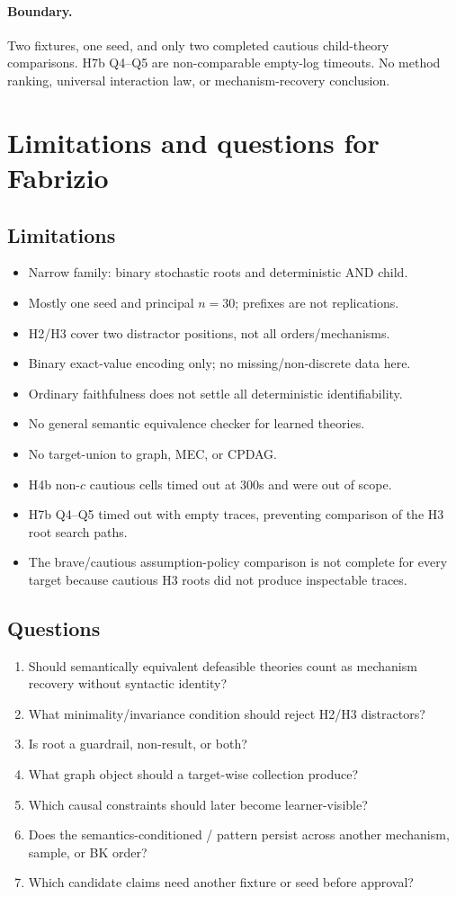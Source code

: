 \documentclass[11pt]{article}
\DeclareRobustCommand{\code}[1]{\texttt{\detokenize{#1}}}
\newcommand{\boundary}{\paragraph{Boundary.}}
\begin{document}
\boundary Two fixtures, one seed, and only two completed cautious child-theory
comparisons. H7b Q4--Q5 are non-comparable empty-log timeouts. No method
ranking, universal interaction law, or mechanism-recovery conclusion.

\section{Limitations and questions for Fabrizio}

\subsection{Limitations}
\begin{itemize}
  \item Narrow family: binary stochastic roots and deterministic AND child.
  \item Mostly one seed and principal \(n=30\); prefixes are not replications.
  \item H2/H3 cover two distractor positions, not all orders/mechanisms.
  \item Binary exact-value encoding only; no missing/non-discrete data here.
  \item Ordinary faithfulness does not settle all deterministic identifiability.
  \item No general semantic equivalence checker for learned theories.
  \item No target-union to graph, MEC, or CPDAG.
  \item H4b non-\(c\) cautious cells timed out at 300s and were out of scope.
  \item H7b Q4--Q5 timed out with empty traces, preventing comparison of the
  H3 root search paths.
  \item The brave/cautious assumption-policy comparison is not complete for
  every target because cautious H3 roots did not produce inspectable traces.
\end{itemize}

\subsection{Questions}
\begin{enumerate}
  \item Should semantically equivalent defeasible theories count as mechanism
  recovery without syntactic identity?
  \item What minimality/invariance condition should reject H2/H3 distractors?
  \item Is root \code{completed_no_solution} a guardrail, non-result, or both?
  \item What graph object should a target-wise collection produce?
  \item Which causal constraints should later become learner-visible?
  \item Does the semantics-conditioned \code{relto}/\code{sechk} pattern
  persist across another mechanism, sample, or BK order?
  \item Which candidate claims need another fixture or seed before approval?
\end{enumerate}
\end{document}
